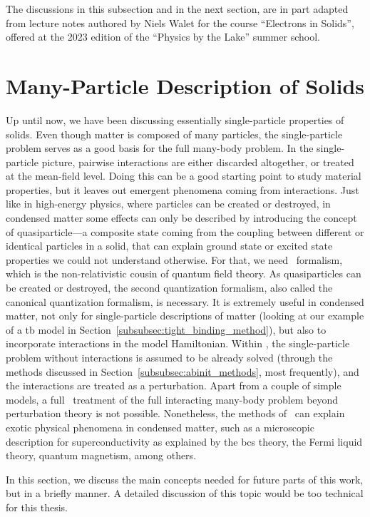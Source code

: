The discussions in this subsection and in the next section, are in part adapted from lecture notes authored by Niels Walet for the course ``Electrons in Solids'', offered at the 2023 edition of the ``Physics by the Lake'' summer school.

\section{Many-Particle Description of Solids}
\label{sec:many_particle_description}

Up until now, we have been discussing essentially single-particle properties of solids.
Even though matter is composed of many particles, the single-particle problem serves as a good basis for the full many-body problem.
In the single-particle picture, pairwise interactions are either discarded altogether, or treated at the mean-field level.
Doing this can be a good starting point to study material properties, but it leaves out emergent phenomena coming from interactions.
Just like in high-energy physics, where particles can be created or destroyed, in condensed matter some effects can only be described by introducing the concept of quasiparticle---a composite state coming from the coupling between different or identical particles in a solid, that can explain ground state or excited state properties we could not understand otherwise.
For that, we need \mbpt~formalism, which is the non-relativistic cousin of quantum field theory.
As quasiparticles can be created or destroyed, the second quantization formalism, also called the canonical quantization formalism, is necessary.
It is extremely useful in condensed matter, not only for single-particle descriptions of matter (looking at our example of a \gls{tb} model in Section~\ref{subsubsec:tight_binding_method}), but also to incorporate interactions in the model Hamiltonian.
Within \mbpt, the single-particle problem without interactions is assumed to be already solved (through the methods discussed in Section~\ref{subsubsec:abinit_methods}, most frequently), and the interactions are treated as a perturbation.
Apart from a couple of simple models, a full \abinit~treatment of the full interacting many-body problem beyond perturbation theory is not possible.
Nonetheless, the methods of \mbpt~can explain exotic physical phenomena in condensed matter, such as a microscopic description for superconductivity as explained by the \gls{bcs} theory, the Fermi liquid theory, quantum magnetism, among others.

In this section, we discuss the main concepts needed for future parts of this work, but in a briefly manner.
A detailed discussion of this topic would be too technical for this thesis.

